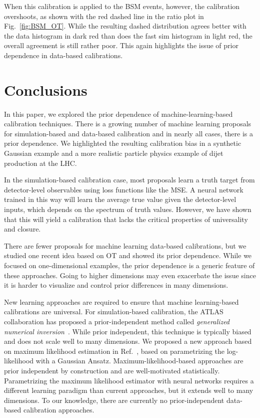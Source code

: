 \documentclass[aps,prd,reprint,preprintnumbers,superscriptaddress,nofootinbib,longbibliography,floatfix]{revtex4-1}
\DeclareRobustCommand{\Fig}[1]{Fig.~\ref{fig:#1}}
\DeclareRobustCommand{\Ref}[1]{Ref.~\cite{#1}}
\begin{document}
When this calibration is applied to the BSM events, however, the calibration overshoots, as shown with the red dashed line in the ratio plot in \Fig{BSM_OT}.
%
While the resulting dashed distribution agrees better with the data histogram in dark red than does the fast sim histogram in light red, the overall agreement is still rather poor.
%
This again highlights the issue of prior dependence in data-based calibrations.



\section{Conclusions}
\label{sec:conclusions}

In this paper, we explored the prior dependence of machine-learning-based calibration techniques.
%
There is a growing number of machine learning proposals for simulation-based and data-based calibration and in nearly all cases, there is a prior dependence.
%
We highlighted the resulting calibration bias in a synthetic Gaussian example and a more realistic particle physics example of dijet production at the LHC.


In the simulation-based calibration case, most proposals learn a truth target from detector-level observables using loss functions like the MSE.
%
A neural network trained in this way will learn the average true value given the detector-level inputs, which depends on the spectrum of truth values.
%
However, we have shown that this will yield a calibration that lacks the critical properties of universality and closure.


There are fewer proposals for machine learning data-based calibrations, but we studied one recent idea based on OT and showed its prior dependence.
%
While we  focused on one-dimensional examples, the prior dependence is a generic feature of these approaches.
%
Going to higher dimensions may even exacerbate the issue since it is harder to visualize and control prior differences in many dimensions.


New learning approaches are required to ensure that machine learning-based calibrations are universal.
%
For simulation-based calibration, the ATLAS collaboration has proposed a prior-independent method called \textit{generalized numerical inversion}~\cite{ATL-PHYS-PUB-2018-013,ATL-PHYS-PUB-2020-001}.
%
While prior independent, this technique is typically biased and does not scale well to many dimensions.
%
We proposed a new approach based on maximum likelihood estimation in \Ref{frequentstway}, based on parametrizing the log-likelihood with a Gaussian Ansatz. 
%
Maximum-likelihood-based approaches are prior independent by construction and are well-motivated statistically.
%
Parametrizing the maximum likelihood estimator with neural networks requires a different learning paradigm than current approaches, but it extends well to many dimensions.
%
To our knowledge, there are currently no prior-independent data-based calibration approaches.  
\end{document}
